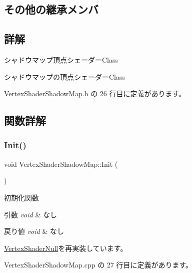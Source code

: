 \subsection*{その他の継承メンバ}


\subsection{詳解}
シャドウマップ頂点シェーダー\+Class 

シャドウマップの頂点シェーダー\+Class 

 Vertex\+Shader\+Shadow\+Map.\+h の 26 行目に定義があります。



\subsection{関数詳解}
\mbox{\label{class_vertex_shader_shadow_map_ad05ff60e979b3d2af8603a118cb51185}} 
\subsubsection{\texorpdfstring{Init()}{Init()}}
{\footnotesize\ttfamily void Vertex\+Shader\+Shadow\+Map\+::\+Init (\begin{DoxyParamCaption}{ }\end{DoxyParamCaption})\hspace{0.3cm}{\ttfamily [virtual]}}



初期化関数 


\begin{DoxyParams}{引数}
{\em void} & なし \\
\hline
\end{DoxyParams}

\begin{DoxyRetVals}{戻り値}
{\em void} & なし \\
\hline
\end{DoxyRetVals}


\mbox{\hyperlink{class_vertex_shader_null_a4d79b358dab49c840345d74823a16840}{Vertex\+Shader\+Null}}を再実装しています。



 Vertex\+Shader\+Shadow\+Map.\+cpp の 27 行目に定義があります。


